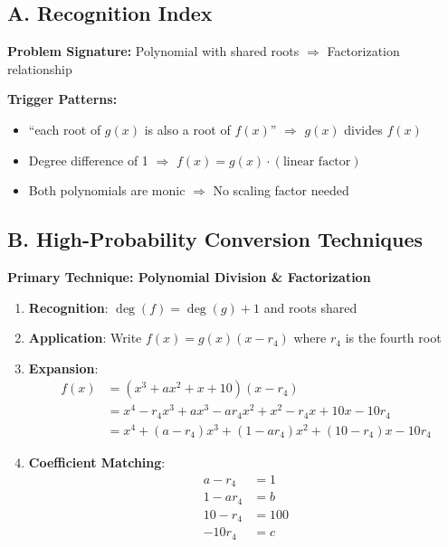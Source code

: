 \documentclass[]{article}
\begin{document}
\begin{techniquesbox}
\subsection*{A. Recognition Index}

\textbf{Problem Signature:} Polynomial with shared roots $\Rightarrow$ Factorization relationship

\textbf{Trigger Patterns:}
\begin{itemize}[leftmargin=*]
    \item ``each root of $g(x)$ is also a root of $f(x)$'' $\Rightarrow$ $g(x)$ divides $f(x)$
    \item Degree difference of 1 $\Rightarrow$ $f(x) = g(x) \cdot (\text{linear factor})$
    \item Both polynomials are monic $\Rightarrow$ No scaling factor needed
\end{itemize}

\subsection*{B. High-Probability Conversion Techniques}

\textbf{Primary Technique: Polynomial Division \& Factorization}
\begin{enumerate}[leftmargin=*]
    \item \textbf{Recognition}: $\deg(f) = \deg(g) + 1$ and roots shared
    \item \textbf{Application}: Write $f(x) = g(x)(x - r_4)$ where $r_4$ is the fourth root
    \item \textbf{Expansion}: 
    \begin{align*}
        f(x) &= (x^3 + ax^2 + x + 10)(x - r_4) \\
        &= x^4 - r_4x^3 + ax^3 - ar_4x^2 + x^2 - r_4x + 10x - 10r_4 \\
        &= x^4 + (a-r_4)x^3 + (1-ar_4)x^2 + (10-r_4)x - 10r_4
    \end{align*}
    \item \textbf{Coefficient Matching}:
    \begin{align*}
        a - r_4 &= 1 \\
        1 - ar_4 &= b \\
        10 - r_4 &= 100 \\
        -10r_4 &= c
    \end{align*}
\end{enumerate}


\end{techniquesbox}
\end{document}
